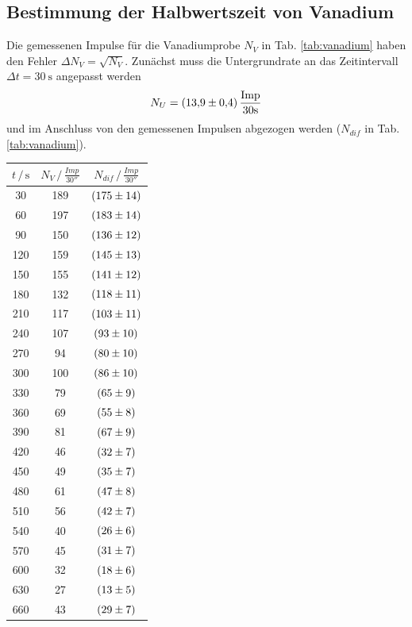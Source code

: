 \subsection{Bestimmung der Halbwertszeit von Vanadium}
Die gemessenen Impulse für die Vanadiumprobe $N_V$ in Tab. \ref{tab:vanadium} haben den Fehler $\Delta N_V = \sqrt{N_V}$.
Zunächst muss die Untergrundrate an das Zeitintervall $\Delta t = \SI{30}{\second}$ angepasst werden
\begin{equation}
    N_U = \SI{13.9+-0.4}{\frac{Imp}{30 \second}}
\end{equation}
und im Anschluss von den gemessenen Impulsen abgezogen werden ($N_{dif}$ in Tab. \ref{tab:vanadium}).
\begin{table}
    \centering
    \begin{tabular}{ccc|}
    \toprule
    $t \,/\, \si{\second}$  & $N_V \,/\, \si{\frac{Imp}{30 \second}}$ & $N_{dif} \,/\, \si{\frac{Imp}{30 \second}}$ \\
    \midrule
    30	& 189 & $\SI{175+-14}{}$ \\
    60	& 197 & $\SI{183+-14}{}$ \\
    90	& 150 & $\SI{136+-12}{}$ \\
    120	& 159 & $\SI{145+-13}{}$ \\
    150	& 155 & $\SI{141+-12}{}$ \\
    180	& 132 & $\SI{118+-11}{}$ \\
    210	& 117 & $\SI{103+-11}{}$ \\
    240	& 107 & $\SI{93+-10}{}$ \\
    270	& 94 &  $\SI{80+-10}{}$ \\
    300	& 100 & $\SI{86+-10}{}$ \\
    330	& 79 & $\SI{65+-9}{}$ \\
    360	& 69 & $\SI{55+-8}{}$ \\
    390	& 81 & $\SI{67+-9}{}$ \\
    420	& 46 & $\SI{32+-7}{}$ \\
    450	& 49 & $\SI{35+-7}{}$ \\
    480	& 61 & $\SI{47+-8}{}$ \\
    510	& 56 & $\SI{42+-7}{}$ \\
    540	& 40 & $\SI{26+-6}{}$ \\
    570	& 45 & $\SI{31+-7}{}$ \\
    600	& 32 & $\SI{18+-6}{}$ \\
    630	& 27 & $\SI{13+-5}{}$ \\
    660	& 43 & $\SI{29+-7}{}$ \\

\end{tabular}
\end{table}
